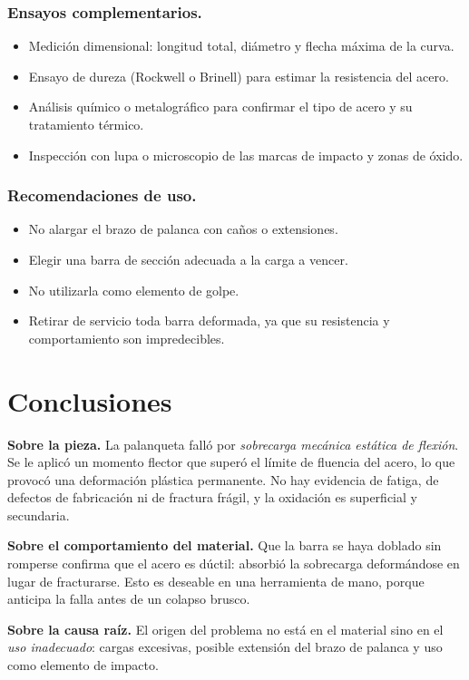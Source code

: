 \documentclass[runningheads]{llncs}
\begin{document}
\subsubsection{Ensayos complementarios.}
\begin{itemize}
\item Medición dimensional: longitud total, diámetro y flecha máxima de la curva.
\item Ensayo de dureza (Rockwell o Brinell) para estimar la resistencia del acero.
\item Análisis químico o metalográfico para confirmar el tipo de acero y su tratamiento térmico.
\item Inspección con lupa o microscopio de las marcas de impacto y zonas de óxido.
\end{itemize}

\subsubsection{Recomendaciones de uso.}
\begin{itemize}
\item No alargar el brazo de palanca con caños o extensiones.
\item Elegir una barra de sección adecuada a la carga a vencer.
\item No utilizarla como elemento de golpe.
\item Retirar de servicio toda barra deformada, ya que su resistencia y comportamiento son impredecibles.
\end{itemize}

\section{Conclusiones}

\textbf{Sobre la pieza.} La palanqueta falló por \emph{sobrecarga mecánica estática de flexión}. Se le aplicó un momento flector que superó el límite de fluencia del acero, lo que provocó una deformación plástica permanente. No hay evidencia de fatiga, de defectos de fabricación ni de fractura frágil, y la oxidación es superficial y secundaria.

\textbf{Sobre el comportamiento del material.} Que la barra se haya doblado sin romperse confirma que el acero es dúctil: absorbió la sobrecarga deformándose en lugar de fracturarse. Esto es deseable en una herramienta de mano, porque anticipa la falla antes de un colapso brusco.

\textbf{Sobre la causa raíz.} El origen del problema no está en el material sino en el \emph{uso inadecuado}: cargas excesivas, posible extensión del brazo de palanca y uso como elemento de impacto.
\end{document}
